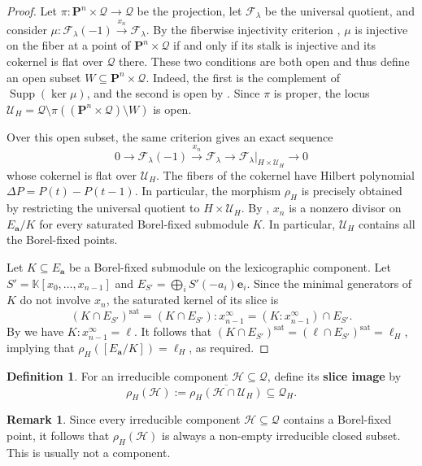 \documentclass[leqno,11pt,a4paper]{amsart}
\theoremstyle{definition}
\newtheorem{remark}[remark]{Remark}
\newtheorem{definition}[definition]{Definition}
\numberwithin{equation}{section}
\newcommand{\kk}{\mathbb{K}}
\newcommand{\bfa}{\mathbf{a}}
\newcommand{\PP}{\mathbf{P}}
\newcommand{\bfe}{\mathbf{e}}
\newcommand{\FF}{\mathscr{F}}
\newcommand{\HH}{\mathcal{H}}
\newcommand{\QQ}{\mathcal{Q}}
\newcommand{\UU}{\mathcal{U}}
\DeclareMathOperator{\Supp}{Supp}
\begin{document}
\begin{proof}
Let $\pi:\PP^n\times\QQ\to\QQ$ be the projection, let $\FF_\lambda$ be the universal quotient, and consider
$\mu:\FF_\lambda(-1) \xrightarrow{x_n} \FF_\lambda$.
By the fiberwise injectivity criterion \cite[\href{https://stacks.math.columbia.edu/tag/00ME}{Tag 00ME}]{stacks_project}, $\mu$ is injective on the fiber at a point of $\PP^n\times\QQ$ if and only if its stalk is injective and its cokernel is flat over $\QQ$
there. 
These two conditions are both open and thus define an open subset $W \subseteq \PP^n \times \QQ$. Indeed, the first is the complement of $\Supp(\ker\mu)$, and the second is open by \cite[\href{https://stacks.math.columbia.edu/tag/0399}{Tag 0399}]{stacks_project}.
Since $\pi$ is proper, the locus $ \UU_H=\QQ\setminus \pi((\PP^n\times\QQ)\setminus W)$ is open.

Over this open subset, the same criterion gives an exact sequence
$$
0 \longrightarrow \FF_\lambda(-1) \xrightarrow{x_n} \FF_\lambda \longrightarrow \FF_\lambda|_{H\times\UU_H} \longrightarrow 0
$$
whose cokernel is flat over $\UU_H$.
The fibers of the cokernel have Hilbert polynomial $\Delta P = P(t) - P(t-1)$.
In particular, the morphism $\rho_H$ is precisely obtained by restricting the universal quotient to $H \times \UU_H$. By , $x_n$ is a nonzero divisor on $E_{\bfa}/K$ for every saturated Borel-fixed submodule $K$. In particular, $\UU_H$ contains all the Borel-fixed points.

Let $K \subseteq E_\bfa$ be a Borel-fixed submodule on the lexicographic component. 
Let $S'=\kk[x_0,\ldots,x_{n-1}]$ and $E_{S'}=\bigoplus_iS'(-a_i)\bfe_i$. 
Since the minimal generators of $K$ do not involve $x_n$, the saturated kernel of its
slice is
$$
(K\cap E_{S'})^{\mathrm{sat}} =(K\cap E_{S'}):x_{n-1}^{\infty} =(K:x_{n-1}^{\infty})\cap E_{S'}.
$$
By  we have $K:x_{n-1}^{\infty} = \ell$. It follows that $(K\cap E_{S'})^{\mathrm{sat}} = (\ell \cap E_{S'})^{\mathrm{sat}} = \ell_H$, implying that $\rho_H([E_{\bfa}/K])=\ell_H$, as required.
\end{proof}

\begin{definition}\label{not:component-slice}
For an irreducible component $\HH\subseteq\QQ$, define its \textbf{slice image} by
$$
\rho_H(\HH) := \overline{\rho_H(\HH\cap\UU_H)}\subseteq\QQ_H.
$$
\end{definition}

\begin{remark}
Since every irreducible component $\HH \subseteq \QQ$ contains a Borel-fixed point, it follows that $\rho_H(\HH)$ is always a non-empty irreducible closed subset. This is usually not a component.
\end{remark}
\end{document}
